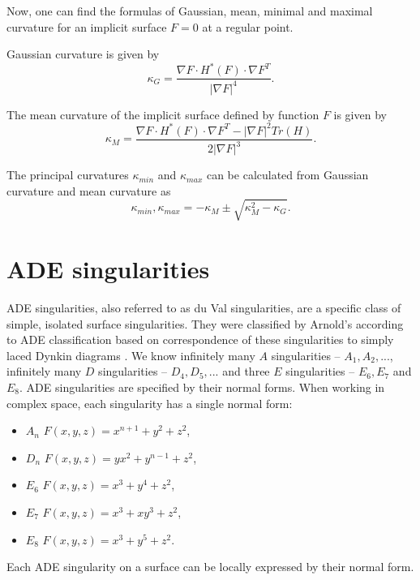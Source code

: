 Now, one can find the formulas of Gaussian, mean, minimal and maximal curvature
for an implicit surface $F=0$ at a regular point.

Gaussian curvature is given by 
$$\kappa_G = \frac{\nabla F \cdot H^*(F) \cdot \nabla F^T}{|\nabla F|^4}.$$

The mean curvature of the implicit surface defined by function $F$ is given by 
$$\kappa_M = \frac{\nabla F \cdot H^*(F) \cdot \nabla F^T - | \nabla F |^2 Tr(H)}{2|\nabla F|^3}.$$

The principal curvatures $\kappa_{min}$ and $\kappa_{max}$ can be calculated from Gaussian curvature and
mean curvature as 
$$\kappa_{min}, \kappa_{max} = - \kappa_M \pm \sqrt{\kappa_M^2-\kappa_G}.$$

\section{ADE singularities}
\label{sub2.2}

ADE singularities, also referred to as du Val singularities, are a specific
class of simple, isolated surface singularities.
They were classified by Arnold's
\cite{arnol1972normal} according to ADE classification
\cite{hazewinkel1977ubiquity} based on
correspondence of these singularities to simply laced Dynkin diagrams
\cite{dynkin1947structure}.
We know infinitely many $A$ singularities -- $A_1, A_2, ...$,
infinitely many $D$ singularities -- $D_4, D_5, ...$ and three $E$
singularities -- $E_6, E_7$ and $E_8$.
ADE singularities are specified by their normal forms.
When working in complex space, each singularity has a single normal form:
\begin{itemize}
    \item $A_n$ \hspace{5mm} $F(x,y,z)=x^{n+1}+y^2+z^2$,
    \item $D_n$ \hspace{5mm} $F(x,y,z)=yx^2+y^{n-1}+z^2$,
    \item $E_6$ \hspace{5mm} $F(x,y,z)=x^3+y^4+z^2$,
    \item $E_7$ \hspace{5mm} $F(x,y,z)=x^3+xy^3+z^2$,
    \item $E_8$ \hspace{5mm} $F(x,y,z)=x^3+y^5+z^2$.
\end{itemize}

Each ADE singularity on a surface can be locally expressed by their
normal form.

